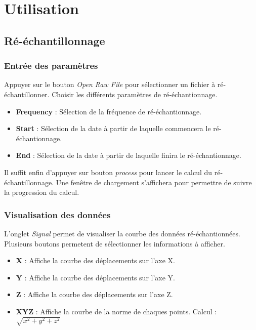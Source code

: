 \documentclass[a4paper,12pt]{article}
\begin{document}
\section{Utilisation}
\subsection{Ré-échantillonnage}
\subsubsection{Entrée des paramètres}
Appuyer sur le bouton \emph{Open Raw File} pour sélectionner un fichier à ré-échantillonner.
Choisir les différents paramètres de ré-échantionnage.
\begin{itemize}
 \item \textbf{Frequency} : Sélection de la fréquence de ré-échantionnage.
 \item \textbf{Start} : Sélection de la date à partir de laquelle commencera le ré-échantionnage.
 \item \textbf{End} : Sélection de la date à partir de laquelle finira le ré-échantionnage.
\end{itemize}

Il suffit enfin d'appuyer sur bouton \emph{process} pour lancer le calcul du ré-échantillonnage. Une fenêtre de chargement s'affichera 
pour permettre de suivre la progression du calcul.


\subsubsection{Visualisation des données}
L'onglet \emph{Signal} permet de visualiser la courbe des données ré-échantionnées.
Plusieurs boutons permetent de sélectionner les informations à afficher.
\begin{itemize}
  \item \textbf{X} : Affiche la courbe des déplacements sur l'axe X.
  \item \textbf{Y} : Affiche la courbe des déplacements sur l'axe Y.
  \item \textbf{Z} : Affiche la courbe des déplacements sur l'axe Z.
  \item \textbf{XYZ} : Affiche la courbe de la norme de chaques points. Calcul : $\sqrt{x^2 + y^2 + z^2}$
\end{itemize}
\end{document}
